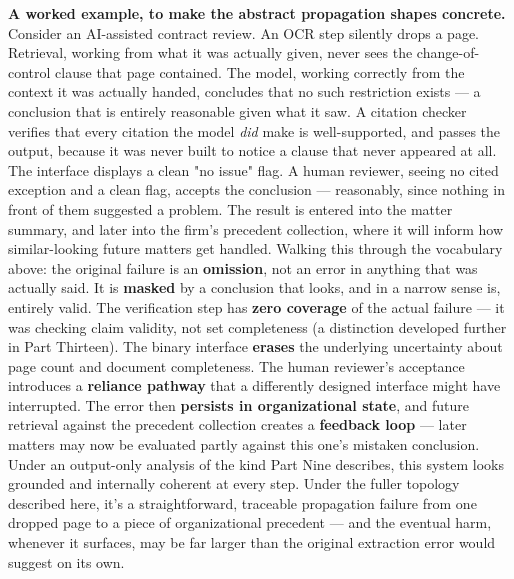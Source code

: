 \textbf{A worked example, to make the abstract propagation shapes concrete.} Consider an AI-assisted contract review. An OCR step silently drops a page. Retrieval, working from what it was actually given, never sees the change-of-control clause that page contained. The model, working correctly from the context it was actually handed, concludes that no such restriction exists --- a conclusion that is entirely reasonable given what it saw. A citation checker verifies that every citation the model \emph{did} make is well-supported, and passes the output, because it was never built to notice a clause that never appeared at all. The interface displays a clean "no issue" flag. A human reviewer, seeing no cited exception and a clean flag, accepts the conclusion --- reasonably, since nothing in front of them suggested a problem. The result is entered into the matter summary, and later into the firm's precedent collection, where it will inform how similar-looking future matters get handled. Walking this through the vocabulary above: the original failure is an \textbf{omission}, not an error in anything that was actually said. It is \textbf{masked} by a conclusion that looks, and in a narrow sense is, entirely valid. The verification step has \textbf{zero coverage} of the actual failure --- it was checking claim validity, not set completeness (a distinction developed further in Part Thirteen). The binary interface \textbf{erases} the underlying uncertainty about page count and document completeness. The human reviewer's acceptance introduces a \textbf{reliance pathway} that a differently designed interface might have interrupted. The error then \textbf{persists in organizational state}, and future retrieval against the precedent collection creates a \textbf{feedback loop} --- later matters may now be evaluated partly against this one's mistaken conclusion. Under an output-only analysis of the kind Part Nine describes, this system looks grounded and internally coherent at every step. Under the fuller topology described here, it's a straightforward, traceable propagation failure from one dropped page to a piece of organizational precedent --- and the eventual harm, whenever it surfaces, may be far larger than the original extraction error would suggest on its own.
